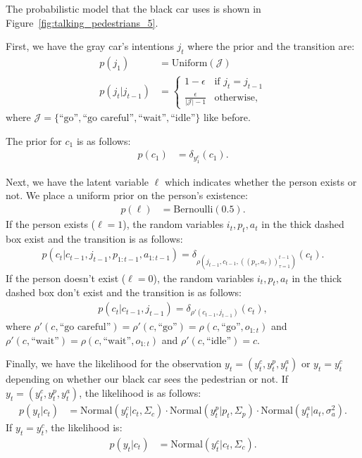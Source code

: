 \documentclass[a4paper]{article}
\newcommand{\given}{\lvert}
\begin{document}
The probabilistic model that the black car uses is shown in Figure~\ref{fig:talking_pedestrians_5}.

First, we have the gray car's intentions $j_t$ where the prior and the transition are:
\begin{align}
    p(j_1) &= \mathrm{Uniform}(\mathcal J) \\
    p(j_t \given j_{t - 1}) &= 
    \begin{cases}
        1 - \epsilon & \text{if } j_t = j_{t - 1} \\
        \frac{\epsilon}{|\mathcal J| - 1} & \text{otherwise},
    \end{cases}
\end{align}
where $\mathcal J = \{\text{``go''}, \text{``go careful''}, \text{``wait''}, \text{``idle''}\}$ like before.

The prior for $c_1$ is as follows:
\begin{align}
    p(c_1) &= \delta_{y_1^c}(c_1).
\end{align}

Next, we have the latent variable $\ell$ which indicates whether the person exists or not. We place a uniform prior on the person's existence:
\begin{align}
    p(\ell) &= \mathrm{Bernoulli}(0.5).
\end{align}
If the person exists ($\ell = 1$), the random variables $i_t, p_t, a_t$ in the thick dashed box exist and the transition is as follows:
\begin{align}
    p(c_t \given c_{t - 1}, j_{t - 1}, p_{1:t - 1}, a_{1:t - 1}) = \delta_{\rho\left(j_{t - 1}, c_{t - 1}, ((p_\tau, a_\tau))_{\tau = 1}^{t - 1}\right)}(c_t).
\end{align}
If the person doesn't exist ($\ell = 0$), the random variables $i_t, p_t, a_t$ in the thick dashed box don't exist and the transition is as follows:
\begin{align}
    p(c_t \given c_{t - 1}, j_{t - 1}) = \delta_{\rho'(c_{t - 1}, j_{t - 1})}(c_t),
\end{align}
where $\rho'(c, \text{``go careful''}) = \rho'(c, \text{``go''}) = \rho(c, \text{``go''}, o_{1:t})$ and $\rho'(c, \text{``wait''}) = \rho(c, \text{``wait''}, o_{1:t})$ and $\rho'(c, \text{``idle''}) = c$.

Finally, we have the likelihood for the observation $y_t = (y_t^c, y_t^p, y_t^a)$ or $y_t = y_t^c$ depending on whether our black car sees the pedestrian or not.
If $y_t = (y_t^c, y_t^p, y_t^a)$, the likelihood is as follows:
\begin{align}
    p(y_t \given c_t) &= \mathrm{Normal}(y_t^c \given c_t, \Sigma_c) \cdot \mathrm{Normal}(y_t^p \given p_t, \Sigma_p) \cdot \mathrm{Normal}(y_t^a \given a_t, \sigma_a^2).
\end{align}
If $y_t = y_t^c$, the likelihood is:
\begin{align}
    p(y_t \given c_t) &= \mathrm{Normal}(y_t^c \given c_t, \Sigma_c).
\end{align}
\end{document}
